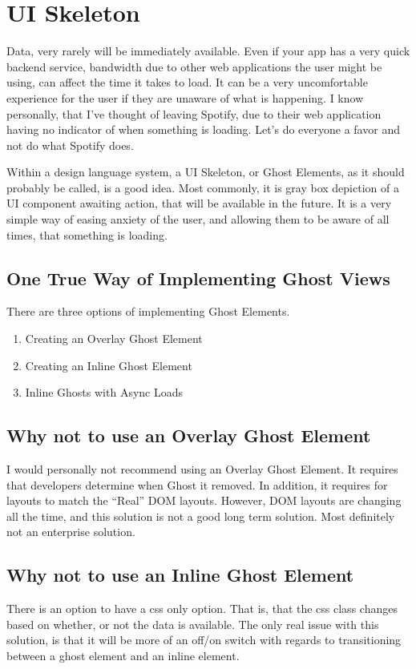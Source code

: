 \section{ UI Skeleton }
\maketitle{}

Data, very rarely will be immediately available. Even if your app has a very
quick backend service, bandwidth due to other web applications the user might
be using, can affect the time it takes to load. It can be a very uncomfortable
experience for the user if they are unaware of what is happening. I know
personally, that I've thought of leaving Spotify, due to their web application
having no indicator of when something is loading. Let's do everyone a favor
and not do what Spotify does.

Within a design language system, a UI Skeleton, or Ghost Elements, as it should
probably be called, is a good idea. Most commonly, it is gray box depiction of
a UI component awaiting action, that will be available in the future. It is a
very simple way of easing anxiety of the user, and allowing them to be aware of
all times, that something is loading.

\subsection{ One True Way of Implementing Ghost Views }
There are three options of implementing Ghost Elements.
\begin{enumerate}
  \item Creating an Overlay Ghost Element
  \item Creating an Inline Ghost Element
  \item Inline Ghosts with Async Loads
\end{enumerate}

\subsection{Why not to use an Overlay Ghost Element}
I would personally not recommend using an Overlay Ghost Element. It requires
that developers determine when Ghost it removed. In addition, it requires for
layouts to match the ``Real'' DOM layouts. However, DOM layouts are changing
all the time, and this solution is not a good long term solution. Most
definitely not an enterprise solution.

\subsection{ Why not to use an Inline Ghost Element }
There is an option to have a css only option. That is, that the css class
changes based on whether, or not the data is available. The only real issue
with this solution, is that it will be more of an off/on switch with regards
to transitioning between a ghost element and an inline element.


